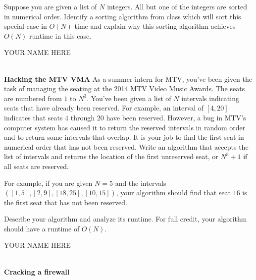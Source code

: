 \documentclass[12pt,twoside]{article}
\newcommand{\yourname}{YOUR NAME HERE}  %
\begin{document}
\begin{problems}
\begin{problemparts}

\problempart {}
Suppose you are given a list of $N$ integers. All but one of the integers are sorted in numerical order. Identify a sorting algorithm from class which will sort this special case in $O(N)$ time and  explain why this sorting algorithm achieves $O(N)$ runtime in this case.


\end{problemparts}

\newpage
\begin{large} \yourname \end{large} \\


\problem {} \textbf{Hacking the MTV VMA}
As a summer intern for MTV, you've been given the task of managing the seating at the 2014 MTV Video Music Awards. The seats are numbered from $1$ to $N^3$. You've been given a list of $N$ intervals indicating seats that have already been reserved. For example, an interval of $[4, 20]$ indicates that seats $4$ through $20$ have been reserved. However, a bug in MTV's computer system has caused it to return the reserved intervals in random order and to return some intervals that overlap. It is your job to find the first seat in numerical order that has not been reserved. Write an algorithm that accepts the list of intervals and returns the location of the first unreserved seat, or $N^3+1$ if all seats are reserved.

For example, if you are given $N=5$ and the intervals $([1, 5], [2, 9], [18, 25], [10, 15])$, your algorithm should find that seat $16$ is the first seat that has not been reserved.

Describe your algorithm and analyze its runtime. For full credit, your algorithm should have a runtime of $O(N)$.


\newpage
\begin{large} \yourname \end{large} \\

\problem {} \textbf{Cracking a firewall}
\begin{problemparts}
\problempart {}


\end{problemparts}
\end{problems}
\end{document}

